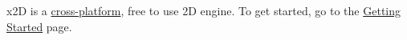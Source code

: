 x2\+D is a \hyperlink{platforms}{cross-\/platform}, free to use 2\+D engine. To get started, go to the \hyperlink{get_started}{Getting Started} page. 